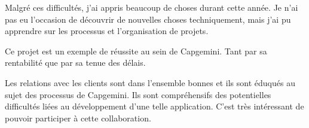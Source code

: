Malgré ces difficultés, j'ai appris beaucoup de choses durant cette année. Je n'ai pas eu l'occasion de découvrir de nouvelles choses techniquement, mais j'ai pu apprendre sur les processus et l'organisation de projets.

Ce projet est un exemple de réussite au sein de Capgemini. Tant par sa rentabilité que par sa tenue des délais.

Les relations avec les clients sont dans l'ensemble bonnes et ils sont éduqués au sujet des processus de Capgemini. Ils sont compréhensifs des potentielles difficultés liées au développement d'une telle application. C'est très intéressant de pouvoir participer à cette collaboration.
